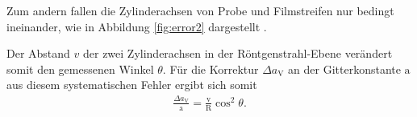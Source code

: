 
Zum andern fallen die Zylinderachsen von Probe und Filmstreifen
nur bedingt ineinander, wie in Abbildung \ref{fig:error2} dargestellt .

Der Abstand $v$ der zwei Zylinderachsen in der Röntgenstrahl-Ebene
verändert somit den gemessenen Winkel $\theta$.
Für die Korrektur $\Delta a_{\mathrm{V}}$ an der Gitterkonstante $\mathrm{a}$
aus diesem systematischen Fehler ergibt sich somit
\begin{align}
  \frac{\Delta a_{\mathrm{V}}}{\mathrm{a}}=\frac{\mathrm{v}}{\mathrm{R}} \cos^2 \theta. \label{eqn:sys2}
\end{align}
